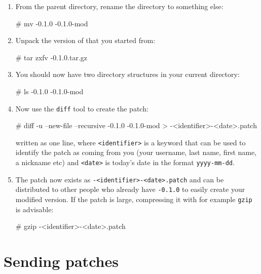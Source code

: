 \begin{enumerate}
\item
  From the parent directory, rename the \package{} directory to something else:
  \begin{code}
 # mv \packagett{}-0.1.0 \packagett{}-0.1.0-mod
  \end{code}
\item
  Unpack the version of \package{} that you started from:
  \begin{code}
 # tar zxfv \packagett{}-0.1.0.tar.gz
  \end{code}
\item
  You should now have two \package{} directory structures in your current directory:
  \begin{code}
 # ls
 \packagett{}-0.1.0
 \packagett{}-0.1.0-mod
  \end{code}
\item
  Now use the \texttt{diff} tool to create the patch:
  \begin{code}
 # diff -u --new-file --recursive \packagett{}-0.1.0
 \packagett{}-0.1.0-mod > \packagett{}-<identifier>-<date>.patch
  \end{code}
  written as one line, where \texttt{<identifier>} is a keyword that
  can be used to identify the patch as coming from you (your username,
  last name, first name, a nickname etc) and \texttt{<date>} is
  today's date in the format \texttt{yyyy-mm-dd}.
\item
  The patch now exists as \texttt{\packagett{}-<identifier>-<date>.patch}
  and can be distributed to other people who already have
  \texttt{\packagett{}-0.1.0} to easily create your modified version. If the
  patch is large, compressing it with for example \texttt{gzip} is
  advisable:
  \begin{code}
 # gzip \packagett{}-<identifier>-<date>.patch
  \end{code}
\end{enumerate}

\section{Sending patches}


